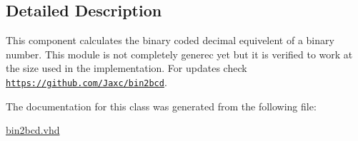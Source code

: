 \subsection{Detailed Description}
This component calculates the binary coded decimal equivelent of a binary number. This module is not completely generec yet but it is verified to work at the size used in the implementation. For updates check \href{https://github.com/Jaxc/bin2bcd}{\tt https\-://github.\-com/\-Jaxc/bin2bcd}. 

The documentation for this class was generated from the following file\-:\begin{DoxyCompactItemize}
\item 
\hyperlink{bin2bcd_8vhd}{bin2bcd.\-vhd}\end{DoxyCompactItemize}

